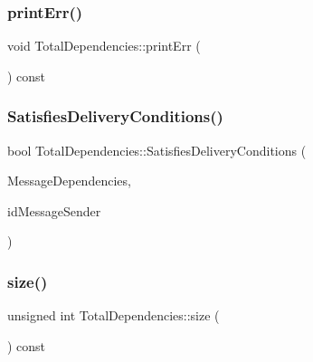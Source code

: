 \mbox{\label{classTotalDependencies_a514df10fe452f2000ceec5e279eae802}} 
\subsubsection{\texorpdfstring{print\+Err()}{printErr()}}
{\footnotesize\ttfamily void Total\+Dependencies\+::print\+Err (\begin{DoxyParamCaption}{ }\end{DoxyParamCaption}) const}

\mbox{\label{classTotalDependencies_a6d050146cb0298091a4614610997d772}} 
\subsubsection{\texorpdfstring{Satisfies\+Delivery\+Conditions()}{SatisfiesDeliveryConditions()}}
{\footnotesize\ttfamily bool Total\+Dependencies\+::\+Satisfies\+Delivery\+Conditions (\begin{DoxyParamCaption}\item[{const \hyperlink{classTotalDependencies}{Total\+Dependencies} \&}]{Message\+Dependencies,  }\item[{unsigned int}]{id\+Message\+Sender }\end{DoxyParamCaption})}

\mbox{\label{classTotalDependencies_a00ea27540cc51d5770d6013a21a41de2}} 
\subsubsection{\texorpdfstring{size()}{size()}}
{\footnotesize\ttfamily unsigned int Total\+Dependencies\+::size (\begin{DoxyParamCaption}{ }\end{DoxyParamCaption}) const}



